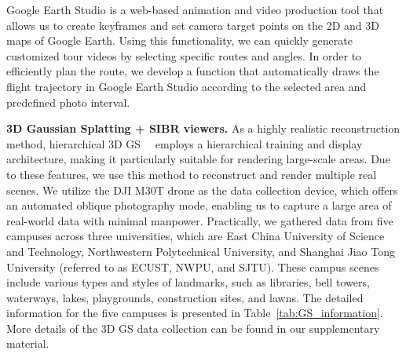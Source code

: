 
Google Earth Studio is a web-based animation and video production tool that allows us to create keyframes and set camera target points on the 2D and 3D maps of Google Earth. Using this functionality, we can quickly generate customized tour videos by selecting specific routes and angles. In order to efficiently plan the route, we develop a function that automatically draws the flight trajectory in Google Earth Studio according to the selected area and predefined photo interval. 



\textbf{3D Gaussian Splatting + SIBR viewers.} As a highly realistic reconstruction method, hierarchical 3D GS~~\cite{kerbl2024hierarchical} employs a hierarchical training and display architecture, making it particularly suitable for rendering large-scale areas. Due to these features, we use this method to reconstruct and render multiple real scenes. We utilize the DJI M30T drone as the data collection device, which offers an automated oblique photography mode, enabling us to capture a large area of real-world data with minimal manpower. Practically, we gathered data from five campuses across three universities, which are East China University of Science and Technology, Northwestern Polytechnical University, and Shanghai Jiao Tong University (referred to as ECUST, NWPU, and SJTU). These campus scenes include various types and styles of landmarks, such as libraries, bell towers, waterways, lakes, playgrounds, construction sites, and lawns. The detailed information for the five campuses is presented in Table~\ref{tab:GS_information}. More details of the 3D GS data collection can be found in our supplementary material.

